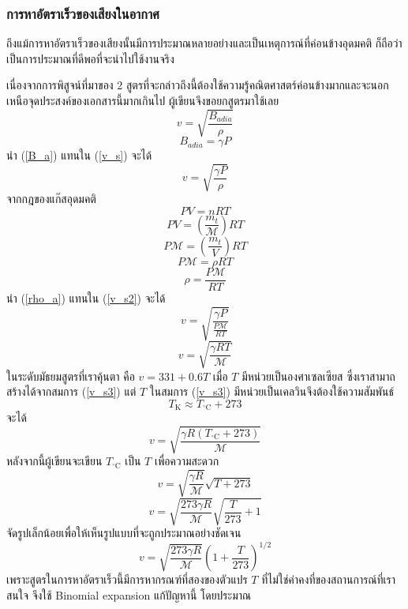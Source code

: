 \documentclass[a4paper,12pt]{article}
\begin{document}
	\subsubsection{การหาอัตราเร็วของเสียงในอากาศ}
	
	ถึงแม้การหาอัตราเร็วของเสียงนั้นมีการประมาณหลายอย่างและเป็นเหตุการณ์ที่ค่อนข้างอุดมคติ ก็ถือว่าเป็นการประมาณที่ดีพอที่จะนำไปใช้งานจริง
	
	เนื่องจากการพิสูจน์ที่มาของ 2 สูตรที่จะกล่าวถึงนี้ต้องใช้ความรู้คณิตศาสตร์ค่อนข้างมากและจะนอกเหนือจุดประสงค์ของเอกสารนี้มากเกินไป ผู้เขียนจึงขอยกสูตรมาใช้เลย
	\begin{equation}\label{v_s}
	v=\sqrt{\frac{B_{adia}}{\rho}}
	\end{equation}
	\begin{equation}\label{B_a}
	B_{adia}=\gamma P
	\end{equation}
	นำ (\ref{B_a}) แทนใน (\ref{v_s}) จะได้
	\begin{equation}\label{v_s2}
	v=\sqrt{\frac{\gamma P}{\rho}}
	\end{equation}
	จากกฎของแก๊สอุดมคติ
	\begin{equation}
	PV=nRT
	\end{equation}
	$$PV=(\frac{m_t}{\mathcal{M}})RT$$
	$$P\mathcal{M}=(\frac{m_t}{V})RT$$
	$$P\mathcal{M}=\rho RT$$
	\begin{equation}\label{rho_a}
	\rho=\frac{P\mathcal{M}}{RT}
	\end{equation}
	นำ (\ref{rho_a}) แทนใน (\ref{v_s2}) จะได้
	$$v=\sqrt{\frac{\gamma P}{\frac{P\mathcal{M}}{RT}}}$$
	\begin{equation}\label{v_s3}
	\boxed{
		v=\sqrt{\frac{\gamma RT}{\mathcal{M}}}
	}
	\end{equation}
	ในระดับมัธยมสูตรที่เราคุ้นตา คือ $v=331+0.6T$ เมื่อ $T$ มีหน่วยเป็นองศาเซลเซียส ซึ่งเราสามาถสร้างได้จากสมการ (\ref{v_s3}) แต่ $T$ ในสมการ (\ref{v_s3}) มีหน่วยเป็นเคลวินจึงต้องใช้ความสัมพันธ์
	$$T_\mathrm{K}\approx T_{^\circ \mathrm{C}}+273$$
	จะได้
	$$v=\sqrt{\frac{\gamma R(T_{^\circ \mathrm{C}}+273)}{\mathcal{M}}}$$
	หลังจากนี้ผู้เขียนจะเขียน $T_{^\circ \mathrm{C}}$ เป็น $T$ เพื่อความสะดวก
	$$v=\sqrt{\frac{\gamma R}{\mathcal{M}}}{\sqrt{T+273}}$$
	$$v=\sqrt{\frac{273\gamma R}{\mathcal{M}}}{\sqrt{\frac{T}{273}+1}}$$
	จัดรูปเล็กน้อยเพื่อให้เห็นรูปแบบที่จะถูกประมาณอย่างชัดเจน
	\begin{equation}\label{v_sb}
	v=\sqrt{\frac{273\gamma R}{\mathcal{M}}}\left(1+\frac{T}{273}\right)^{1/2}
	\end{equation}
	เพราะสูตรในการหาอัตราเร็วนี้มีการหากรณฑ์ที่สองของตัวแปร $T$ ที่ไม่ใช่ค่าคงที่ของสถานการณ์ที่เราสนใจ จึงใช้ Binomial expansion แก้ปัญหานี้ โดยประมาณ
\end{document}
